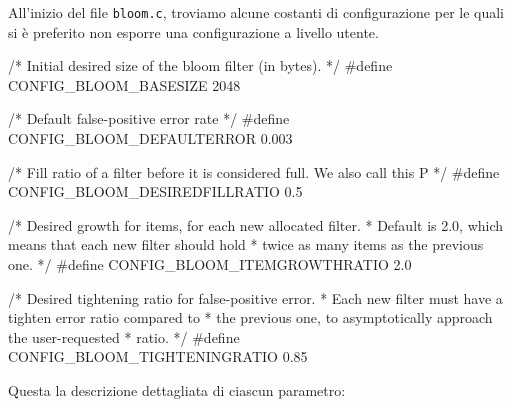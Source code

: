 All'inizio del file \verb|bloom.c|, troviamo alcune costanti di configurazione per le quali si è
preferito non esporre una configurazione a livello utente.

\begin{commentedsource}[style=csource,caption=Parametri statici]
/* Initial desired size of the bloom filter (in bytes). */
#define CONFIG_BLOOM_BASESIZE 2048 

/* Default false-positive error rate */
#define CONFIG_BLOOM_DEFAULTERROR 0.003

/* Fill ratio of a filter before it is considered full. We also call this P */
#define CONFIG_BLOOM_DESIREDFILLRATIO 0.5

/* Desired growth for items, for each new allocated filter.
 * Default is 2.0, which means that each new filter should hold
 * twice as many items as the previous one. */
#define CONFIG_BLOOM_ITEMGROWTHRATIO 2.0

/* Desired tightening ratio for false-positive error.
 * Each new filter must have a tighten error ratio compared to
 * the previous one, to asymptotically approach the user-requested
 * ratio. */
#define CONFIG_BLOOM_TIGHTENINGRATIO 0.85
\end{commentedsource}

Questa la descrizione dettagliata di ciascun parametro:

